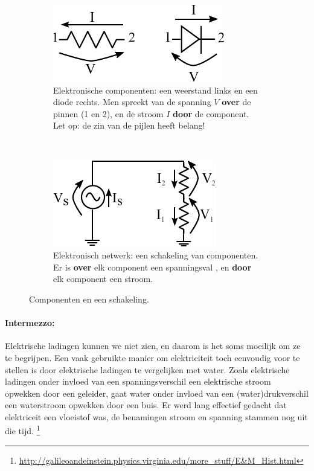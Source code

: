 \documentclass{article}
\begin{document}
		\begin{figure}[hbtp]
			\centering
			\begin{subfigure}[b]{0.5\linewidth}
				\centering
				\includegraphics{componenten}
				\caption{Elektronische componenten: een weerstand links en een diode rechts. Men spreekt van de spanning $V$ \textbf{over} de pinnen (1 en 2), en de stroom $I$ \textbf{door} de component. Let op: de zin van de pijlen heeft belang!}
				\label{subfig:componenten}
			\end{subfigure}
			~
			\begin{subfigure}[b]{0.5\linewidth}
				\centering
				\includegraphics{weerstandsdeler}
				\caption{Elektronisch netwerk: een schakeling van componenten. Er is \textbf{over} elk component een spanningsval , en \textbf{door} elk component een stroom.}
				\label{subfig:netwerk}
			\end{subfigure}
			\caption{Componenten en een schakeling. }
			\label{fig:component_en_schakeling}
		\end{figure}

		\paragraph*{Intermezzo:} Elektrische ladingen kunnen we niet zien, en daarom is het soms moeilijk om ze te begrijpen. Een vaak gebruikte manier om elektriciteit toch eenvoudig voor te stellen is door elektrische ladingen te vergelijken met water. Zoals elektrische ladingen onder invloed van een spanningsverschil een elektrische stroom opwekken door een geleider, gaat water onder invloed van een (water)drukverschil een waterstroom opwekken door een buis. Er werd lang effectief gedacht dat elektriceit een vloeistof was, de benamingen stroom en spanning stammen nog uit die tijd. \footnote{\url{http://galileoandeinstein.physics.virginia.edu/more_stuff/E&M_Hist.html}}
\end{document}
